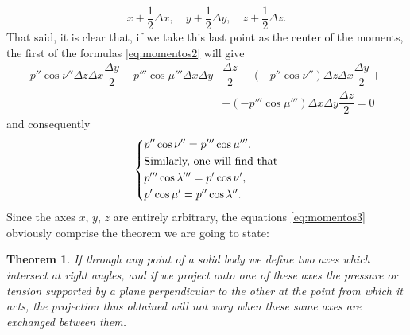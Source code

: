\documentclass[leqno,openright,smallroyalvopaper,8pt,twoside,showtrims]{memoir}
\newtheorem{thm}{Theorem}
\begin{document}
\begin{equation*}
x+\dfrac{1}{2} \Delta x,\quad y+\dfrac{1}{2} \Delta y,\quad z+\dfrac{1}{2} \Delta z.
\end{equation*}
That said, it is clear that, if we take this last point as the center of the moments, the first of the formulas \eqref{eq:momentos2} will give
\begin{align*}
p''\cos\nu''\Delta z\Delta x\dfrac{\Delta y}{2}- p'''\cos\mu'''\Delta x\Delta y&\dfrac{\Delta z}{2}-(-p''\cos\nu'')\Delta z\Delta x\dfrac{\Delta y}{2}+\\
&+(-p'''\cos\mu''')\Delta x\Delta y\dfrac{\Delta z}{2}=0
\end{align*}
and consequently 
\begin{equation}\label{eq:momentos3}
   \begin{dcases}
   p''\cos\nu'' = p'''\cos\mu'''.\\
\text{Similarly, one will find that}\\
p'''\cos\lambda''' = p'\cos\nu',\\
p'\cos\mu'=p''\cos\lambda''.
    \end{dcases}
 \end{equation}
Since the axes $x$, $y$, $z$ are entirely arbitrary, the equations \eqref{eq:momentos3} obviously comprise the theorem we are going to state:
\begin{thm}
If through any point of a solid body we define two axes which intersect at right angles, and if we project onto one of these axes the pressure or tension supported by a plane perpendicular to the other at the point from which it acts, the projection thus obtained will not vary when these same axes are exchanged between them.
\end{thm} 
\end{document}
